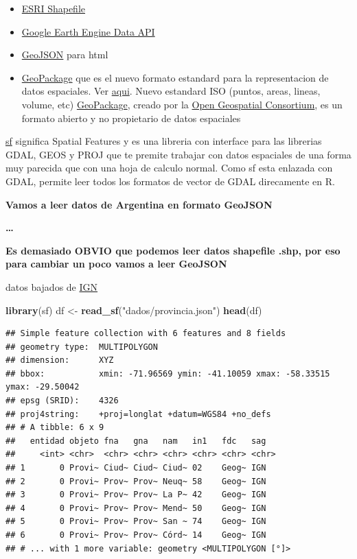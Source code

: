 \documentclass[]{book}
\newenvironment{Shaded}{\begin{snugshade}}{\end{snugshade}}
\newcommand{\KeywordTok}[1]{\textcolor[rgb]{0.13,0.29,0.53}{\textbf{#1}}}
\newcommand{\NormalTok}[1]{#1}
\newcommand{\StringTok}[1]{\textcolor[rgb]{0.31,0.60,0.02}{#1}}
\providecommand{\tightlist}{%
  \setlength{\itemsep}{0pt}\setlength{\parskip}{0pt}}
\begin{document}
\begin{itemize}
\tightlist
\item
  \href{https://gdal.org/drivers/vector/shapefile.html}{ESRI Shapefile}
\item
  \href{https://gdal.org/drivers/vector/eeda.html}{Google Earth Engine Data API}
\item
  \href{https://gdal.org/drivers/vector/geojson.html}{GeoJSON} para html
\item
  \href{https://gdal.org/drivers/vector/gpkg.html}{GeoPackage} que es el nuevo formato estandard para la representacion de datos espaciales. Ver \href{https://en.wikipedia.org/wiki/GeoPackage}{aqui}. Nuevo estandard ISO (puntos, areas, lineas, volume, etc) \href{https://en.wikipedia.org/wiki/GeoPackage}{GeoPackage}, creado por la \href{https://www.opengeospatial.org/standards/geopackage}{Open Geospatial Consortium}, es un formato abierto y no propietario de datos espaciales
\end{itemize}

\href{https://github.com/r-spatial/sf}{sf} significa Spatial Features y es una libreria con interface para las librerias GDAL, GEOS y PROJ que te premite trabajar con datos espaciales de una forma muy parecida que con una hoja de calculo normal.
Como sf esta enlazada con GDAL, permite leer todos los formatos de vector de GDAL direcamente en R.

\textbf{Vamos a leer datos de Argentina en formato GeoJSON}

\textbf{\ldots{}}

\textbf{Es demasiado OBVIO que podemos leer datos shapefile .shp, por eso para cambiar un poco vamos a leer GeoJSON}

datos bajados de \href{http://www.ign.gob.ar/NuestrasActividades/InformacionGeoespacial/CapasSIG}{IGN}

\begin{Shaded}
\begin{Highlighting}[]
\KeywordTok{library}\NormalTok{(sf)}
\NormalTok{df <-}\StringTok{ }\KeywordTok{read_sf}\NormalTok{(}\StringTok{"dados/provincia.json"}\NormalTok{)}
\KeywordTok{head}\NormalTok{(df)}
\end{Highlighting}
\end{Shaded}

\begin{verbatim}
## Simple feature collection with 6 features and 8 fields
## geometry type:  MULTIPOLYGON
## dimension:      XYZ
## bbox:           xmin: -71.96569 ymin: -41.10059 xmax: -58.33515 ymax: -29.50042
## epsg (SRID):    4326
## proj4string:    +proj=longlat +datum=WGS84 +no_defs
## # A tibble: 6 x 9
##   entidad objeto fna   gna   nam   in1   fdc   sag  
##     <int> <chr>  <chr> <chr> <chr> <chr> <chr> <chr>
## 1       0 Provi~ Ciud~ Ciud~ Ciud~ 02    Geog~ IGN  
## 2       0 Provi~ Prov~ Prov~ Neuq~ 58    Geog~ IGN  
## 3       0 Provi~ Prov~ Prov~ La P~ 42    Geog~ IGN  
## 4       0 Provi~ Prov~ Prov~ Mend~ 50    Geog~ IGN  
## 5       0 Provi~ Prov~ Prov~ San ~ 74    Geog~ IGN  
## 6       0 Provi~ Prov~ Prov~ Córd~ 14    Geog~ IGN  
## # ... with 1 more variable: geometry <MULTIPOLYGON [°]>
\end{verbatim}
\end{document}
